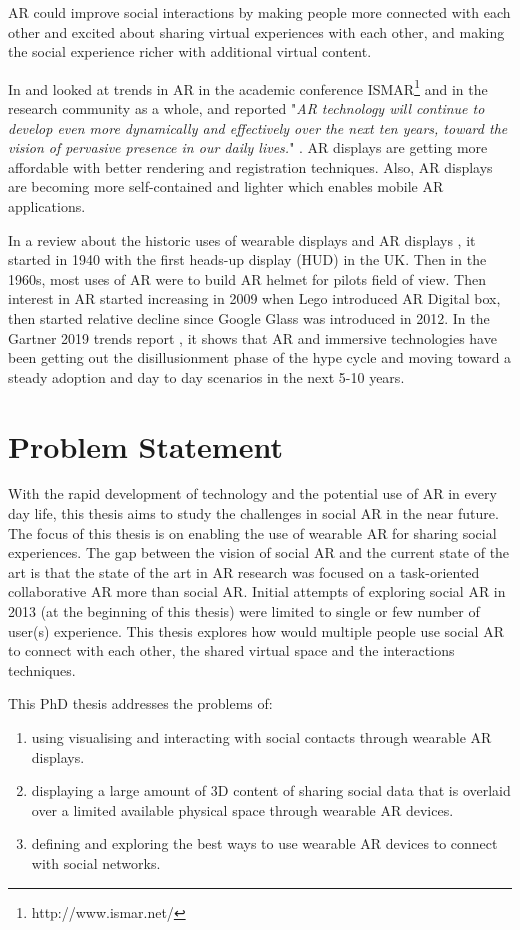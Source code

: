 AR could improve social interactions by making people more connected with each other and excited about sharing virtual experiences with each other, and making the social experience richer with additional virtual content. 

In \cite{Zhou2008} and \cite{Kim2018} looked at trends in AR in the academic conference ISMAR\footnote{http://www.ismar.net/} and in the research community as a whole, and reported "\textit{AR technology will continue to develop even more dynamically and effectively over the next ten years, toward the vision of pervasive presence in our daily lives.}" \cite{Kim2018}. AR displays are getting more affordable with better rendering and registration techniques. Also, AR displays are becoming more self-contained and lighter which enables mobile AR applications.

In a review about the historic uses of wearable displays and AR displays \cite{Peddie2017}, it started in 1940 with the first heads-up display (HUD) in the UK. Then in the 1960s, most uses of AR were to build AR helmet for pilots field of view. Then interest in AR started increasing in 2009 when Lego introduced AR Digital box, then started relative decline since Google Glass was introduced in 2012. In the Gartner 2019 trends report \cite{gartner2019}, it shows that AR and immersive technologies have been getting out the disillusionment phase of the hype cycle and moving toward a steady adoption and day to day scenarios in the next 5-10 years.

\section{Problem Statement}

With the rapid development of technology and the potential use of AR in every day life, this thesis aims to study the challenges in social AR in the near future. The focus of this thesis is on enabling the use of wearable AR for sharing social experiences. The gap between the vision of social AR and the current state of the art is that the state of the art in AR research was focused on a task-oriented collaborative AR more than social AR. Initial attempts of exploring social AR in 2013 (at the beginning of this thesis) were limited to single or few number of user(s) experience. This thesis explores how would multiple people use social AR to connect with each other, the shared virtual space and the interactions techniques. 

This PhD thesis addresses the problems of: 
\begin{enumerate}
    \item using visualising and interacting with social contacts through wearable AR displays.
    \item displaying a large amount of 3D content of sharing social data that is overlaid over a limited available physical space through wearable AR devices.
    \item defining and exploring the best ways to use wearable AR devices to connect with social networks.
\end{enumerate}

